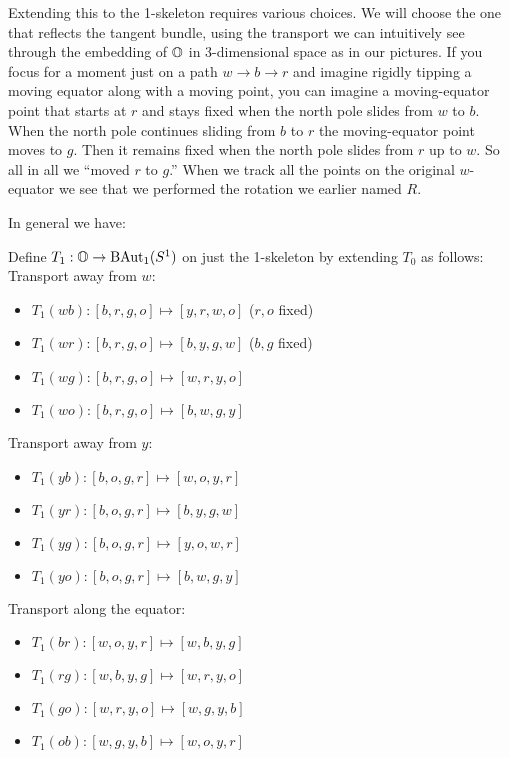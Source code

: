 \documentclass[12pt]{article}
\begin{document}
Extending this to the 1-skeleton requires various choices. We will choose the one that reflects the tangent bundle, using the transport we can intuitively see through the embedding of \( \mathbb{O} \) in 3-dimensional space as in our pictures. If you focus for a moment just on a path \( w\to b\to r \) and imagine rigidly tipping a moving equator along with a moving point, you can imagine a moving-equator point that starts at \( r \) and stays fixed when the north pole slides from \( w \) to \( b \). When the north pole continues sliding from \( b \) to \( r \) the moving-equator point moves to \( g \). Then it remains fixed when the north pole slides from \( r \) up to \( w \). So all in all we ``moved \( r \) to \( g \).'' When we track all the points on the original \( w \)-equator we see that we performed the rotation we earlier named \( R \).

In general we have:
\begin{mydef}
Define \( T_1:\mathbb{O}\to\mathrm{BAut}_1(S^1) \) on just the 1-skeleton by extending \( T_0 \) as follows:
Transport away from \( w \):
\begin{itemize}
\item \( T_1(wb):[b, r, g, o]\mapsto [y, r, w, o] \) (\( r, o \) fixed)
\item \( T_1(wr):[b, r, g, o]\mapsto [b, y, g, w] \) (\( b, g \) fixed)
\item \( T_1(wg):[b, r, g, o]\mapsto [w, r, y, o] \)
\item \( T_1(wo):[b, r, g, o]\mapsto [b, w, g, y] \)
\end{itemize}
Transport away from \( y \):
\begin{itemize}
\item \( T_1(yb):[b, o, g, r]\mapsto [w, o, y, r] \)
\item \( T_1(yr):[b, o, g, r]\mapsto [b, y, g, w] \)
\item \( T_1(yg):[b, o, g, r]\mapsto [y, o, w, r] \)
\item \( T_1(yo):[b, o, g, r]\mapsto [b, w, g, y] \)
\end{itemize}
Transport along the equator:
\begin{itemize}
\item \( T_1(br):[w, o, y, r]\mapsto [w, b, y, g] \) 
\item \( T_1(rg):[w, b, y, g]\mapsto [w, r, y, o] \)
\item \( T_1(go):[w, r, y, o]\mapsto [w, g, y, b] \)
\item \( T_1(ob):[w, g, y, b]\mapsto [w, o, y, r] \)
\end{itemize}
\end{mydef}
\end{document}
